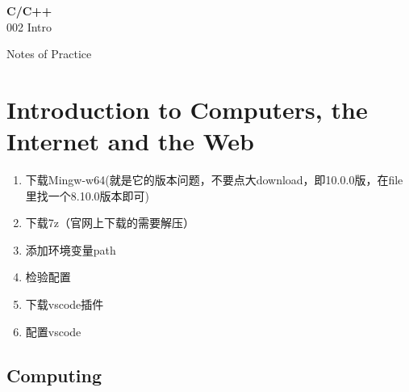\documentclass{book}
\begin{document}
 \begin{titlepage}
 \color{darkgray} 
 \begingroup
 \thispagestyle{empty}
 \centering
 \vspace*{5cm}
 \par\normalfont\fontsize{35}{35}\sffamily\selectfont
 \textbf{C/C++}\\ 
 {\LARGE 002 Intro}\par %
 \vspace*{1cm}
 {\Huge Notes of Practice}\par %
 \endgroup
 \end{titlepage}



 \section{Introduction to Computers, the Internet and the Web}


\par \begin{enumerate}
 \item 下载Mingw-w64(就是它的版本问题，不要点大download，即10.0.0版，在file里找一个8.10.0版本即可)
 \item 下载7z（官网上下载的需要解压）
 \item 添加环境变量path
 \item 检验配置
 \item 下载vscode插件
 \item 配置vscode
\end{enumerate}

\color{darkgray}
 \begin{shaded}
 {\subsection[short]{Computing}}
\end{shaded}
\color{black}
\end{document}
